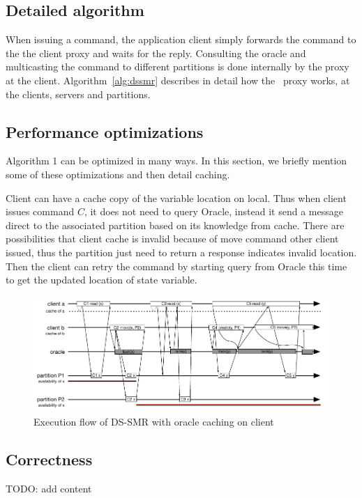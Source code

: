 \subsection{Detailed algorithm}
\label{sec:algorithm}

When issuing a command, the application client simply forwards the command to the the client proxy and waits for the reply.
Consulting the oracle and multicasting the command to different partitions is done internally by the proxy at the client.
Algorithm~\ref{alg:dssmr} describes in detail how the \dssmr\ proxy works, at the clients, servers and partitions.







%

\subsection{Performance optimizations}
\label{sec:optm}

Algorithm 1 can be optimized in many ways. In this section, we briefly mention some of these optimizations and then detail caching.

Client can have a cache copy of the variable location on local. Thus when client issues command $C$, it does not need to query Oracle, instead it send a message direct to the associated partition based on its knowledge from cache. There are possibilities that client cache is invalid because of move command other client issued, thus the partition just need to return a response indicates invalid location. Then the client can retry the command by starting query from Oracle this time to get the updated location of state variable. 

\begin{figure}
\begin{minipage}[b]{1\linewidth} %
\centering
      \includegraphics[width=0.85\linewidth]{figures/cache}
\end{minipage}
\caption{Execution flow of DS-SMR with oracle caching on client}
\label{fig:cache}
\end{figure}

\subsection{Correctness}
\label{sec:correctness}
TODO: add content